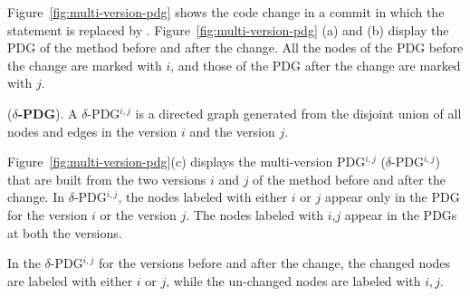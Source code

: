 Figure~\ref{fig:multi-version-pdg} shows the code change in a commit
in which the statement  is replaced by
. Figure~\ref{fig:multi-version-pdg} (a) and
(b) display the PDG of the method  before and after
the change. All the nodes of the PDG before the change are marked with
$i$, and those of the PDG after the change are marked with $j$.


\begin{Definition} ({\bf $\delta$-PDG}).
A $\delta$-PDG$^{i,j}$ is a directed graph generated from the disjoint
union of all nodes and edges in the version $i$ and the version $j$.
%
\end{Definition}

Figure~\ref{fig:multi-version-pdg}(c) displays the multi-version
PDG$^{i,j}$ ($\delta$-PDG$^{i,j}$) that are built from the two
versions $i$ and $j$ of the method  before and after
the change. In $\delta$-PDG$^{i,j}$, the nodes labeled with either $i$
or $j$ appear only in the PDG for the version $i$ or the version $j$.
The nodes labeled with $i$,$j$ appear in the PDGs at both the
versions.


\begin{Definition}
In the $\delta$-PDG$^{i,j}$ for the versions before and after the
change, the changed nodes are labeled with either $i$ or $j$, while
the un-changed nodes are labeled with $i,j$.
\end{Definition}

